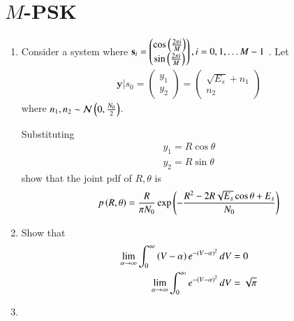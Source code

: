 \documentclass[journal,12pt,twocolumn]{IEEEtran}
\renewcommand\thesection{\arabic{section}}
\begin{document}
\section{$M$-PSK}
\begin{enumerate}[label=\thesection.\arabic*.,ref=\thesection.\theenumi]

\item Consider a system where 
$\mathbf{s}_i=
\begin{pmatrix}
\cos\left(\frac{2\pi i}{M}\right)\\
\sin\left(\frac{2\pi i}{M}\right)
\end{pmatrix}, i = 0, 1 , \dots M-1
$
.
Let
%
\begin{align}
\mathbf{y}|s_0 = 
\begin{pmatrix}
y_1\\
y_2
\end{pmatrix}
=
\begin{pmatrix}
\sqrt{E_s}+n_1\\
n_2
\end{pmatrix}
\end{align}
where $n_1,n_2 \sim \mathcal{N}\left(0,\frac{N_0}{2}\right)$.

 Substituting 
\begin{align}
y_1=R\cos \theta \\
y_2=R\sin \theta
\end{align}
show that the joint pdf of $R,\theta$ is
%
\begin{equation}
p\left(R,\theta\right)=\frac{R}{\pi N_0}\exp\left(-\frac{R^2-2R\sqrt{E_s}\cos \theta + E_s}{N_0}\right)
\end{equation}
\item

Show that 
%
\begin{align}
\label{eq:mpsk_alpha1}
\lim_{\alpha \rightarrow \infty}\int_{0}^{\infty}\left(V-\alpha \right)e^{-\left(V-\alpha\right)^2 }\,dV
&= 0
\\
\label{eq:mpsk_alpha2}
\lim_{\alpha \rightarrow \infty}\int_{0}^{\infty} e^{-\left(V-\alpha\right)^2 }\,dV
&=  \sqrt{\pi}
\end{align}
\item


\end{enumerate}
\end{document}
